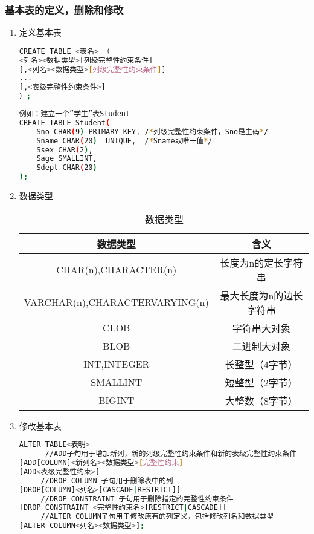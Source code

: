 \subsubsection{基本表的定义，删除和修改}
\begin{enumerate}
\item 定义基本表
\begin{lstlisting}[language=bash]
CREATE TABLE <表名> （
<列名><数据类型>[列级完整性约束条件]
[,<列名><数据类型>[列级完整性约束条件]]
...
[,<表级完整性约束条件>]
）;
\end{lstlisting}
\begin{lstlisting}[language=bash]
例如：建立一个”学生”表Student
CREATE TABLE Student(
    Sno CHAR(9) PRIMARY KEY, /*列级完整性约束条件，Sno是主码*/
    Sname CHAR(20)  UNIQUE,  /*Sname取唯一值*/ 
    Ssex CHAR(2),
    Sage SMALLINT,
    Sdept CHAR(20)
);

\end{lstlisting}
\item 数据类型
\begin{table}[ht]
\centering
\caption{数据类型}\label{tab_SQLgrm}
\begin{tabular}{|c|c|}
\hline
数据类型 & 含义 \\
\hline
CHAR(n),CHARACTER(n) & 长度为n的定长字符串\\
\hline
VARCHAR(n),CHARACTERVARYING(n) & 最大长度为n的边长字符串 \\
\hline
CLOB& 字符串大对象\\
\hline
BLOB & 二进制大对象 \\
\hline
INT,INTEGER & 长整型（4字节） \\
\hline
SMALLINT & 短整型（2字节） \\
\hline
BIGINT& 大整数（8字节） \\
\hline
\end{tabular}
\end{table}
\item 修改基本表
\begin{lstlisting}[language=bash]
ALTER TABLE<表明>
      //ADD子句用于增加新列，新的列级完整性约束条件和新的表级完整性约束条件
[ADD[COLUMN]<新列名><数据类型>[完整性约束]
[ADD<表级完整性约束>]
     //DROP COLUMN 子句用于删除表中的列
[DROP[COLUMN]<列名>[CASCADE|RESTRICT]]
     //DROP CONSTRAINT 子句用于删除指定的完整性约束条件
[DROP CONSTRAINT <完整性约束名>[RESTRICT|CASCADE]]
     //ALTER COLUMN子句用于修改原有的列定义，包括修改列名和数据类型
[ALTER COLUMN<列名><数据类型>];
\end{lstlisting}
\end{enumerate}
